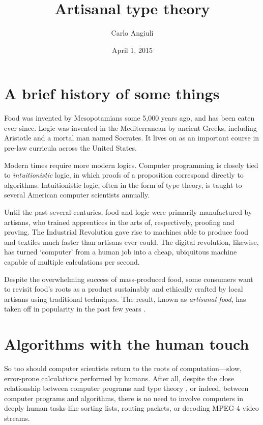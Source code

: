 \documentclass[10pt]{article}
\title{Artisanal type theory}
\author{Carlo Angiuli}
\date{April 1, 2015}
\begin{document}
\maketitle

\section{A brief history of some things}

Food was invented by Mesopotamians some 5,000 years ago, and has been eaten ever
since. 
%
Logic was invented in the Mediterranean by ancient Greeks, including Aristotle
and a mortal man \cite{Aristotle40} named Socrates. It lives on as an important
course in pre-law curricula across the United States. 

Modern times require more modern logics. Computer programming is closely tied to
\emph{intuitionistic} logic, in which proofs of a proposition correspond
directly to algorithms. Intuitionistic logic, often in the form of type theory,
is taught to several American computer scientists annually.

Until the past several centuries, food and logic were primarily manufactured by
artisans, who trained apprentices in the arts of, respectively, proofing and
proving.
%
The Industrial Revolution gave rise to machines able to produce food and
textiles much faster than artisans ever could.
%
The digital revolution, likewise, has turned `computer' from a human job into a
cheap, ubiquitous machine capable of multiple calculations per second.

Despite the overwhelming success of mass-produced food, some consumers want to
revisit food's roots as a product sustainably and ethically crafted by local
artisans using traditional techniques. The result, known as \emph{artisanal
food}, has taken off in popularity in the past few years \cite{NYT09,Cope14}.

\section{Algorithms with the human touch}

So too should computer scientists return to the roots of computation---slow,
error-prone calculations performed by humans. After all, despite the close
relationship between computer programs and type theory \cite{MartinLof85}, or
indeed, between computer programs and algorithms, there is no need to involve
computers in deeply human tasks like sorting lists, routing packets, or decoding
MPEG-4 video streams.
\end{document}
